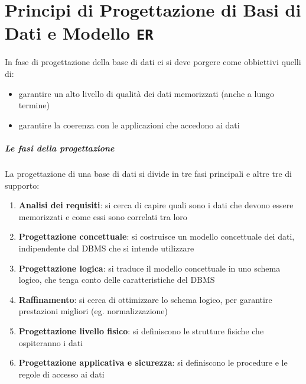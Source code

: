 \chapter[Progettazione \texttt{BdD} \& modello \texttt{ER}]{Principi di Progettazione di Basi di Dati e Modello \texttt{ER}}
\thispagestyle{chapterInit}
\label{ch:IlModelloER}
In fase di progettazione della base di dati ci si deve porgere come obbiettivi quelli di:
\begin{itemize}
    \item garantire un alto livello di qualità dei dati memorizzati (anche a lungo termine)
    \item garantire la coerenza con le applicazioni che accedono ai dati
\end{itemize}
\paragraph{Le fasi della progettazione}
    La progettazione di una base di dati si divide in tre fasi principali e altre tre di supporto:
    \begin{enumerate}
        \item \textbf{Analisi dei requisiti}: si cerca di capire quali sono i dati che devono essere memorizzati e come essi sono correlati tra loro
        \item \textbf{Progettazione concettuale}: si costruisce un modello concettuale dei dati, indipendente dal DBMS che si intende utilizzare
        \item \textbf{Progettazione logica}: si traduce il modello concettuale in uno schema logico, che tenga conto delle caratteristiche del DBMS
        \item \textbf{Raffinamento}: si cerca di ottimizzare lo schema logico, per garantire prestazioni migliori (eg. normalizzazione)
        \item \textbf{Progettazione livello fisico}: si definiscono le strutture fisiche che ospiteranno i dati
        \item \textbf{Progettazione applicativa e sicurezza}: si definiscono le procedure e le regole di accesso ai dati
    \end{enumerate}

